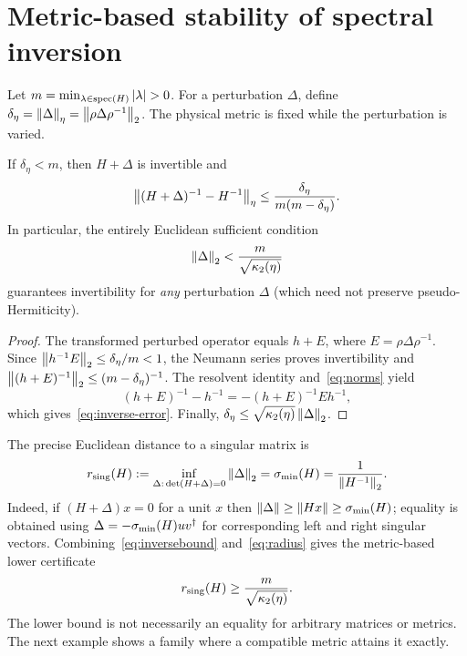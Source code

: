 \section{Metric-based stability of spectral inversion}
Let $m=\min_{\lambda\in\operatorname{spec}(H)}\left\lvert \lambda\right\rvert>0$.
For a perturbation $\Delta$, define
$\delta_\eta=\left\lVert \Delta\right\rVert_\eta=\left\lVert \rho\Delta\rho^{-1}\right\rVert_2$.
The physical metric is fixed while the perturbation is varied.

\begin{theorem}\label{thm:pert}
If $\delta_\eta<m$, then $H+\Delta$ is invertible and
\begin{equation}\label{eq:inverse-error}
 \left\lVert (H+\Delta)^{-1}-H^{-1}\right\rVert_\eta
 \leq \frac{\delta_\eta}{m(m-\delta_\eta)}.
\end{equation}
In particular, the entirely Euclidean sufficient condition
\begin{equation}\label{eq:euclcertificate}
 \left\lVert \Delta\right\rVert_2<\frac{m}{\sqrt{\kappa_2(\eta)}}
\end{equation}
guarantees invertibility for \emph{any} perturbation $\Delta$ (which need not
preserve pseudo-Hermiticity).
\end{theorem}
\begin{proof}
The transformed perturbed operator equals
$h+E$, where $E=\rho\Delta\rho^{-1}$.
Since $\left\lVert h^{-1}E\right\rVert_2\leq\delta_\eta/m<1$,
the Neumann series proves invertibility and
$\left\lVert (h+E)^{-1}\right\rVert_2\leq(m-\delta_\eta)^{-1}$.
The resolvent identity and~\eqref{eq:norms} yield
\begin{equation}
 (h+E)^{-1}-h^{-1}=-(h+E)^{-1}Eh^{-1},
\end{equation}
which gives~\eqref{eq:inverse-error}. Finally,
$\delta_\eta\leq\sqrt{\kappa_2(\eta)}\left\lVert \Delta\right\rVert_2$.
\end{proof}

The precise Euclidean distance to a singular matrix is
\begin{equation}\label{eq:radius}
 r_{\mathrm{sing}}(H)
 :=\inf_{\Delta:\,\det(H+\Delta)=0}\left\lVert \Delta\right\rVert_2
 =\sigma_{\min}(H)=\frac{1}{\left\lVert H^{-1}\right\rVert_2}.
\end{equation}
Indeed, if $(H+\Delta)x=0$ for a unit $x$ then
$\left\lVert \Delta\right\rVert\geq\left\lVert Hx\right\rVert\geq\sigma_{\min}(H)$; equality is obtained using
$\Delta=-\sigma_{\min}(H)uv^\dagger$ for corresponding left and right
singular vectors. Combining~\eqref{eq:inversebound} and~\eqref{eq:radius}
gives the metric-based lower certificate
\begin{equation}\label{eq:radiusbound}
 r_{\mathrm{sing}}(H)\geq\frac{m}{\sqrt{\kappa_2(\eta)}}.
\end{equation}
The lower bound is not necessarily an equality for arbitrary matrices or metrics.
The next example shows a family where a compatible metric attains it exactly.

